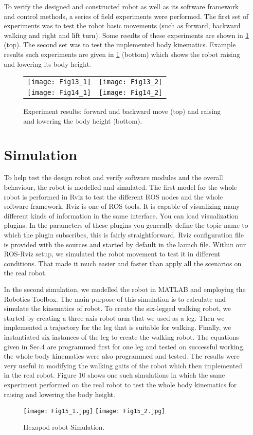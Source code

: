 To verify the designed and constructed robot as well as its software framework and control methods, a series of field experiments were performed.
The first set of experiments was to test the robot basic movements (such as forward, backward walking and right and lift turn). Some results of these experiments are shown in \ref{robot} (top). The second set was to test the implemented body kinematics. Example results such experiments are given in \ref{robot} (bottom) which shows the robot raising and lowering its body height.
\begin{figure}[H]
	\centering
	\begin{tabular}{ l l }
		\texttt{[image: Fig13\_1]} & 
        \texttt{[image: Fig13\_2]} \\ 
		\texttt{[image: Fig14\_1]} & 
        \texttt{[image: Fig14\_2]} \\ 
	\end{tabular}
	\caption{Experiment results: forward and backward move (top) and raising and lowering the body height (bottom).}
	\label{robot}
\end{figure}
\newpage

\section{Simulation}
To help test the design robot and verify software modules and the overall behaviour, the robot is modelled and simulated. The first model for the whole robot is performed in Rviz to test the different ROS nodes and the whole software framework. Rviz is one of ROS tools. It is capable of visualizing many different kinds of information in the same interface. You can load visualization plugins. In the parameters of these plugins you generally define the topic name to which the plugin subscribes, this is fairly straightforward. Rviz configuration file is provided with the sources and started by default in the launch file. Within our ROS-Rviz setup, we simulated the robot movement to test it in different conditions. That made it much easier and faster than apply all the scenarios on the real robot.

In the second simulation, we modelled the robot in MATLAB and employing the Robotics Toolbox. The main purpose of this simulation is to calculate and simulate the kinematics of robot. To create the six-legged walking robot, we started by creating a three-axis robot arm that we used as a leg. Then we implemented a trajectory for the leg that is suitable for walking. Finally, we instantiated six instances of the leg to create the walking robot. The equations given in Sec.4 are programmed first for one leg and tested on successful working, the whole body kinematics were also programmed and tested.
The results were very useful in modifying the walking gaits of the robot which then implemented in the real robot. Figure 10 shows one such simulations in which the same experiment performed on the real robot to test the whole body kinematics for raising and lowering the body height.

\begin{figure}[h]
	\centering
	\texttt{[image: Fig15\_1.jpg]} 
    \texttt{[image: Fig15\_2.jpg]}
	\caption{ Hexapod robot Simulation.}
	\label{sim}
\end{figure}